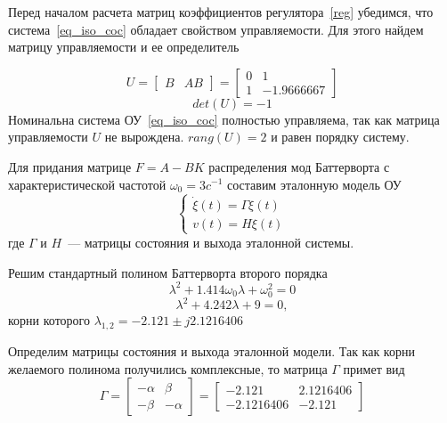 Перед началом расчета матриц коэффициентов регулятора~\ref{reg} убедимся, что система~\ref{eq_iso_coc} обладает свойством управляемости. Для этого найдем матрицу управляемости и ее определитель

\begin{equation}
	U = 
	\begin{bmatrix}
	B & A B
	\end{bmatrix}
	=
	\begin{bmatrix}
	0  &  1\\         
	1 & - 1.9666667
	\end{bmatrix}
\end{equation}
\begin{equation}
	det(U) = -1
\end{equation}
Номинальна система ОУ~\ref{eq_iso_coc} полностью управляема, так как матрица управляемости $U$ не вырождена. $rang(U) = 2$ и равен порядку систему.

Для придания матрице $F = A - BK$ распределения мод Баттерворта с характеристической частотой $\omega_0 = 3 c^{-1}$ составим эталонную модель ОУ
\begin{equation}
	\begin{cases}
		\dot \xi (t) = \Gamma \xi(t)\\
		v (t) = H \xi(t)
	\end{cases}
\end{equation}
где $\Gamma$ и $H$~--- матрицы состояния и выхода эталонной системы.

Решим стандартный полином Баттерворта второго порядка
\begin{equation}
\lambda^2 + 1.414 \omega_0 \lambda + \omega_0^2 = 0
\end{equation}
\begin{equation}
\lambda^2 + 4.242 \lambda + 9 = 0,
\end{equation}
корни которого $\lambda_{1,2} = - 2.121 \pm j 2.1216406 $


Определим матрицы состояния и выхода эталонной модели. Так как корни желаемого полинома получились комплексные, то матрица $\Gamma$ примет вид
\begin{equation}
	\Gamma = 
	\begin{bmatrix}
	-\alpha & \beta\\
	-\beta & -\alpha
	\end{bmatrix}
	=
	\begin{bmatrix}
	 - 2.121    &    2.1216406  \\
	- 2.1216406  &- 2.121 	
	\end{bmatrix}
\end{equation}

